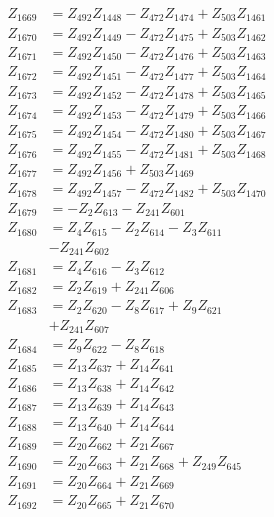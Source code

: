 \begin{multicols}{2}
\begin{align}
Z_{1669} &= Z_{492}Z_{1448} - Z_{472}Z_{1474} + Z_{503}Z_{1461} \nonumber \\
Z_{1670} &= Z_{492}Z_{1449} - Z_{472}Z_{1475} + Z_{503}Z_{1462} \nonumber \\
Z_{1671} &= Z_{492}Z_{1450} - Z_{472}Z_{1476} + Z_{503}Z_{1463} \nonumber \\
Z_{1672} &= Z_{492}Z_{1451} - Z_{472}Z_{1477} + Z_{503}Z_{1464} \nonumber \\
Z_{1673} &= Z_{492}Z_{1452} - Z_{472}Z_{1478} + Z_{503}Z_{1465} \nonumber \\
Z_{1674} &= Z_{492}Z_{1453} - Z_{472}Z_{1479} + Z_{503}Z_{1466} \nonumber \\
Z_{1675} &= Z_{492}Z_{1454} - Z_{472}Z_{1480} + Z_{503}Z_{1467} \nonumber \\
Z_{1676} &= Z_{492}Z_{1455} - Z_{472}Z_{1481} + Z_{503}Z_{1468} \nonumber \\
Z_{1677} &= Z_{492}Z_{1456} + Z_{503}Z_{1469} \nonumber \\
Z_{1678} &= Z_{492}Z_{1457} - Z_{472}Z_{1482} + Z_{503}Z_{1470} \nonumber \\
Z_{1679} &= - Z_{2}Z_{613} - Z_{241}Z_{601} \nonumber \\
Z_{1680} &= Z_{4}Z_{615} - Z_{2}Z_{614} - Z_{3}Z_{611}  \nonumber \\
&- Z_{241}Z_{602} \nonumber \\
Z_{1681} &= Z_{4}Z_{616} - Z_{3}Z_{612} \nonumber \\
Z_{1682} &= Z_{2}Z_{619} + Z_{241}Z_{606} \nonumber \\
Z_{1683} &= Z_{2}Z_{620} - Z_{8}Z_{617} + Z_{9}Z_{621}  \nonumber \\
&+ Z_{241}Z_{607} \nonumber \\
Z_{1684} &= Z_{9}Z_{622} - Z_{8}Z_{618} \nonumber \\
Z_{1685} &= Z_{13}Z_{637} + Z_{14}Z_{641} \nonumber \\
Z_{1686} &= Z_{13}Z_{638} + Z_{14}Z_{642} \nonumber \\
Z_{1687} &= Z_{13}Z_{639} + Z_{14}Z_{643} \nonumber \\
Z_{1688} &= Z_{13}Z_{640} + Z_{14}Z_{644} \nonumber \\
Z_{1689} &= Z_{20}Z_{662} + Z_{21}Z_{667} \nonumber \\
Z_{1690} &= Z_{20}Z_{663} + Z_{21}Z_{668} + Z_{249}Z_{645} \nonumber \\
Z_{1691} &= Z_{20}Z_{664} + Z_{21}Z_{669} \nonumber \\
Z_{1692} &= Z_{20}Z_{665} + Z_{21}Z_{670} \nonumber \\

\end{align}
\end{multicols}
